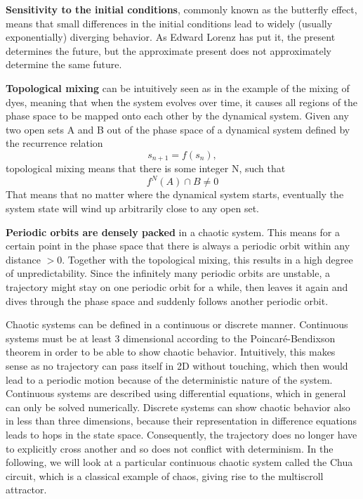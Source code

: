 \documentclass[main]{subfiles}
\begin{document}
\textbf{Sensitivity to the initial conditions}, commonly known as the butterfly effect, means that small differences in the initial conditions lead to widely (usually exponentially) diverging behavior. %
%
As Edward Lorenz has put it, the present determines the future, but the approximate present does not approximately determine the same future.

\textbf{Topological mixing} can be intuitively seen as in the example of the mixing of dyes, meaning that when the system evolves over time, it causes all regions of the phase space to be mapped onto each other by the dynamical system. %
%
Given any two open sets A and B out of the phase space of a dynamical system defined by the recurrence relation %
%
\[s_{n+1} = f(s_n),\]
%
topological mixing means that there is some integer N, such that \[f^N(A) \cap B \neq 0\] %
%
That means that no matter where the dynamical system starts, eventually the system state will wind up arbitrarily close to any open set.

\textbf{Periodic orbits are densely packed} in a chaotic system. %
%
This means for a certain point in the phase space that there is always a periodic orbit within any distance \(> 0\). %
%
Together with the topological mixing, this results in a high degree of unpredictability. %
%
Since the infinitely many periodic orbits are unstable, a trajectory might stay on one periodic orbit for a while, then leaves it again and dives through the phase space and suddenly follows another periodic orbit.

Chaotic systems can be defined in a continuous or discrete manner. %
%
Continuous systems must be at least 3 dimensional according to the Poincaré-Bendixson theorem \cite{bib:Bendixon1901} in order to be able to show chaotic behavior. %
%
Intuitively, this makes sense as no trajectory can pass itself in 2D without touching, which then would lead to a periodic motion because of the deterministic nature of the system. %
%
Continuous systems are described using differential equations, which in general can only be solved numerically. %
%
Discrete systems can show chaotic behavior also in less than three dimensions, because their representation in difference equations leads to hops in the state space. %
%
Consequently, the trajectory does no longer have to explicitly cross another and so does not conflict with determinism. %
%
In the following, we will look at a particular continuous chaotic system called the Chua circuit, which is a classical example of chaos, giving rise to the multiscroll attractor.
\end{document}
